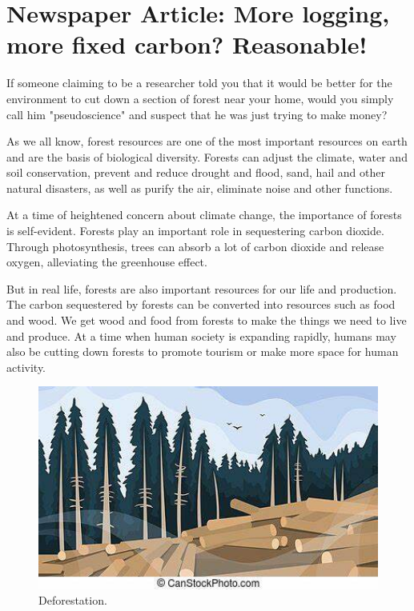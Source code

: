 
\section{Newspaper Article: More logging, more fixed carbon? Reasonable!}

If someone claiming to be a researcher told you that it would be better for the environment to cut down a section of forest near your home, would you simply call him "pseudoscience" and suspect that he was just trying to make money?

As we all know, forest resources are one of the most important resources on earth and are the basis of biological diversity. Forests can adjust the climate, water and soil conservation, prevent and reduce drought and flood, sand, hail and other natural disasters, as well as purify the air, eliminate noise and other functions.

At a time of heightened concern about climate change, the importance of forests is self-evident. Forests play an important role in sequestering carbon dioxide. Through photosynthesis, trees can absorb a lot of carbon dioxide and release oxygen, alleviating the greenhouse effect.

But in real life, forests are also important resources for our life and production. The carbon sequestered by forests can be converted into resources such as food and wood. We get wood and food from forests to make the things we need to live and produce. At a time when human society is expanding rapidly, humans may also be cutting down forests to promote tourism or make more space for human activity.

\begin{figure}[htp]
    \centering
    \includegraphics[width=13cm]{figs/logging.jpg}
    \caption{Deforestation.}
    \label{fig:my_label}
\end{figure}


